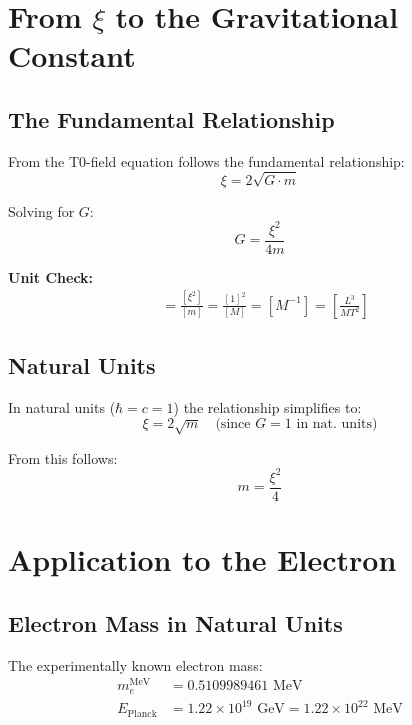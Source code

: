 \documentclass[12pt,a4paper]{article}
\theoremstyle{definition}
\begin{document}
	\section{From $\xi$ to the Gravitational Constant}
	
	\subsection{The Fundamental Relationship}
	
	From the T0-field equation follows the fundamental relationship:
	\begin{equation}
		\xi = 2\sqrt{G \cdot m}
	\end{equation}
	
	Solving for $G$:
	\begin{equation}
		\boxed{G = \frac{\xi^2}{4m}}
	\end{equation}
	
	{\footnotesize
		\textbf{Unit Check:}
		\begin{align}
			[G] &= \frac{[\xi^2]}{[m]} = \frac{[1]^2}{[M]} = [M^{-1}] = \left[\frac{L^3}{MT^2}\right]
		\end{align}
	}
	
	\subsection{Natural Units}
	
	In natural units ($\hbar = c = 1$) the relationship simplifies to:
	\begin{equation}
		\xi = 2\sqrt{m} \quad \text{(since } G = 1 \text{ in nat. units)}
	\end{equation}
	
	From this follows:
	\begin{equation}
		m = \frac{\xi^2}{4}
	\end{equation}
	
	\section{Application to the Electron}
	
	\subsection{Electron Mass in Natural Units}
	
	The experimentally known electron mass:
	\begin{align}
		m_e^{\text{MeV}} &= 0.5109989461 \text{ MeV}\\
		E_{\text{Planck}} &= 1.22 \times 10^{19} \text{ GeV} = 1.22 \times 10^{22} \text{ MeV}
	\end{align}
	
\end{document}
